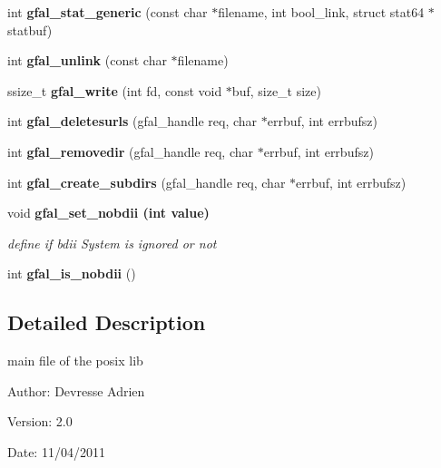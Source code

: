 \begin{CompactItemize}
\item 
int \textbf{gfal\_\-stat\_\-generic} (const char $\ast$filename, int bool\_\-link, struct stat64 $\ast$statbuf)\label{gfal__posix_8c_678840d435b1b1a34645fa21d34e1102}

\item 
int \textbf{gfal\_\-unlink} (const char $\ast$filename)\label{group__posix__group_gdeb4c6cc47f507da3e3b498374e308fb}

\item 
ssize\_\-t \textbf{gfal\_\-write} (int fd, const void $\ast$buf, size\_\-t size)\label{group__posix__group_g00c2d64894ae81c05846b06c84727ae9}

\item 
int \textbf{gfal\_\-deletesurls} (gfal\_\-handle req, char $\ast$errbuf, int errbufsz)\label{gfal__posix_8c_72e48640200202bb9e9cf47e8a71f942}

\item 
int \textbf{gfal\_\-removedir} (gfal\_\-handle req, char $\ast$errbuf, int errbufsz)\label{gfal__posix_8c_8482ace6bde89a99f66d52bb66e012d9}

\item 
int \textbf{gfal\_\-create\_\-subdirs} (gfal\_\-handle req, char $\ast$errbuf, int errbufsz)\label{gfal__posix_8c_2a4f0aab963f1f1006953333907ecdbb}

\item 
void \bf{gfal\_\-set\_\-nobdii} (int value)
\begin{CompactList}\small\item\em define if bdii System is ignored or not \item\end{CompactList}\item 
int \textbf{gfal\_\-is\_\-nobdii} ()\label{group__internal__group_g0d2a0557bdb571ccb85c6ab5c05ae56f}

\end{CompactItemize}


\subsection{Detailed Description}
main file of the posix lib 

\begin{Desc}
\item[Author:]Devresse Adrien \end{Desc}
\begin{Desc}
\item[Version:]2.0 \end{Desc}
\begin{Desc}
\item[Date:]11/04/2011 \end{Desc}
